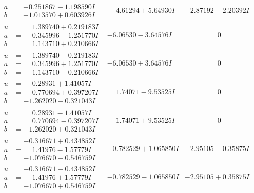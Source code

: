 \documentclass[1p]{elsarticle_modified}
\theoremstyle{definition}
\begin{document}
$$\begin{array}{c|c|c}
\begin{aligned}
a &= -0.251867 - 1.198590 I \\
b &= -1.013570 + 0.603926 I\end{aligned}
 & \phantom{-}4.61294 + 5.64930 I & -2.87192 - 2.20392 I \\ \hline\begin{aligned}
u &= \phantom{-}1.389740 + 0.219183 I \\
a &= \phantom{-}0.345996 - 1.251770 I \\
b &= \phantom{-}1.143710 + 0.210666 I\end{aligned}
 & -6.06530 - 3.64576 I & \phantom{-0.000000 } 0 \\ \hline\begin{aligned}
u &= \phantom{-}1.389740 - 0.219183 I \\
a &= \phantom{-}0.345996 + 1.251770 I \\
b &= \phantom{-}1.143710 - 0.210666 I\end{aligned}
 & -6.06530 + 3.64576 I & \phantom{-0.000000 } 0 \\ \hline\begin{aligned}
u &= \phantom{-}0.28931 + 1.41057 I \\
a &= \phantom{-}0.770694 + 0.397207 I \\
b &= -1.262020 - 0.321043 I\end{aligned}
 & \phantom{-}1.74071 - 9.53525 I & \phantom{-0.000000 } 0 \\ \hline\begin{aligned}
u &= \phantom{-}0.28931 - 1.41057 I \\
a &= \phantom{-}0.770694 - 0.397207 I \\
b &= -1.262020 + 0.321043 I\end{aligned}
 & \phantom{-}1.74071 + 9.53525 I & \phantom{-0.000000 } 0 \\ \hline\begin{aligned}
u &= -0.316671 + 0.434852 I \\
a &= \phantom{-}1.41976 - 1.57779 I \\
b &= -1.076670 - 0.546759 I\end{aligned}
 & -0.782529 + 1.065850 I & -2.95105 - 0.35875 I \\ \hline\begin{aligned}
u &= -0.316671 - 0.434852 I \\
a &= \phantom{-}1.41976 + 1.57779 I \\
b &= -1.076670 + 0.546759 I\end{aligned}
 & -0.782529 - 1.065850 I & -2.95105 + 0.35875 I \\ \hline\begin{aligned}

\end{aligned}
\end{array}$$
\end{document}
